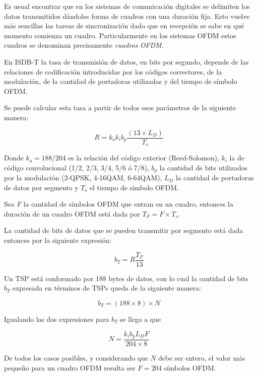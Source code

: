 Es usual encontrar que en los sistemas de comunicación digitales se delimiten los datos transmitidos dándoles forma de cuadros con una duración fija. Esto vuelve más sencillas las tareas de sincronización dado que en recepción se sabe en qué momento comienza un cuadro. Particularmente en los sistemas OFDM estos cuadros se denominan precisamente \textit{cuadros OFDM}. 

En ISDB-T la tasa de transmisión de datos, en bits por segundo, depende de las relaciones de codificación introducidas por los códigos correctores, de la modulación, de la cantidad de portadoras utilizadas y del tiempo de símbolo OFDM.

Se puede calcular esta tasa a partir de todos esos parámetros de la siguiente manera:

\begin{equation}
R = k_o k_i b_p \dfrac{ (13 \times L_D)}{T_s}
\end{equation}

Donde $k_o = 188/204$ es la relación del código exterior (Reed-Solomon), $k_i$ la de código convolucional (1/2, 2/3, 3/4, 5/6 ó 7/8), $b_p$ la cantidad de bits utilizados por la modulación (2-QPSK, 4-16QAM, 6-64QAM), $L_D$ la cantidad de portadoras de datos por segmento y $T_s$ el tiempo de símbolo OFDM.

Sea $F$ la cantidad de símbolos OFDM que entran en un cuadro, entonces la duración de un cuadro OFDM está dada por $T_F = F \times T_s$.

La cantidad de bits de datos que se pueden transmitir por segmento está dada entonces por la siguiente expresión:

\begin{equation}
b_T = R \dfrac{T_F}{13}
\end{equation}

Un TSP está conformado por 188 bytes de datos, con lo cual la cantidad de bits $b_T$ expresada en términos de TSPs queda de la siguiente manera:

\begin{equation}
b_T = (188 \times 8 ) \times N
\end{equation}

Igualando las dos expresiones para $b_T$ se llega a que

\begin{equation}
N = \dfrac{ k_i b_p L_D F}{204 \times 8}
\end{equation}

De todos los casos posibles, y considerando que $N$ debe ser entero, el valor más pequeño para un cuadro OFDM resulta ser $F=204$ símbolos OFDM.

